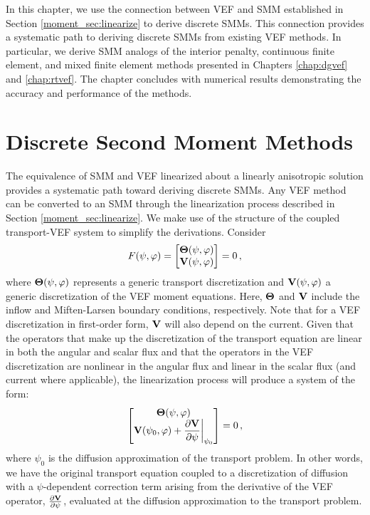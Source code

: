 \documentclass[../doc.tex]{subfiles}
\begin{document}
In this chapter, we use the connection between VEF and SMM established in Section \ref{moment_sec:linearize} to derive discrete SMMs. This connection provides a systematic path to deriving discrete SMMs from existing VEF methods. In particular, we derive SMM analogs of the interior penalty, continuous finite element, and mixed finite element methods presented in Chapters \ref{chap:dgvef} and \ref{chap:rtvef}. The chapter concludes with numerical results demonstrating the accuracy and performance of the methods. 

\section{Discrete Second Moment Methods}
The equivalence of SMM and VEF linearized about a linearly anisotropic solution provides a systematic path toward deriving discrete SMMs. Any VEF method can be converted to an SMM through the linearization process described in Section \ref{moment_sec:linearize}. We make use of the structure of the coupled transport-VEF system to simplify the derivations. Consider
	\begin{equation}
		F(\psi,\varphi) = \begin{bmatrix} 
			\boldsymbol{\mathrm{\Theta}}(\psi,\varphi) \\ \boldsymbol{\mathrm{V}}(\psi,\varphi) 
		\end{bmatrix} = 0\,,
	\end{equation}
where $\boldsymbol{\mathrm{\Theta}}(\psi,\varphi)$ represents a generic transport discretization and $\boldsymbol{\mathrm{V}}(\psi,\varphi)$ a generic discretization of the VEF moment equations. Here, $\boldsymbol{\mathrm{\Theta}}$ and $\boldsymbol{\mathrm{V}}$ include the inflow and Miften-Larsen boundary conditions, respectively. Note that for a VEF discretization in first-order form, $\boldsymbol{\mathrm{V}}$ will also depend on the current. Given that the operators that make up the discretization of the transport equation are linear in both the angular and scalar flux and that the operators in the VEF discretization are nonlinear in the angular flux and linear in the scalar flux (and current where applicable), the linearization process will produce a system of the form: 
	\begin{equation}
		\begin{bmatrix} 
			\boldsymbol{\mathrm{\Theta}}(\psi,\varphi) \\
			\displaystyle\boldsymbol{\mathrm{V}}(\psi_0,\varphi) + \frac{\partial \boldsymbol{\mathrm{V}}}{\partial \psi}\biggr\rvert_{\psi_0}
		\end{bmatrix} = 0 \,, 
	\end{equation}
where $\psi_0$ is the diffusion approximation of the transport problem. 
In other words, we have the original transport equation coupled to a discretization of diffusion with a $\psi$-dependent correction term arising from the derivative of the VEF operator, $\frac{\partial \boldsymbol{\mathrm{V}}}{\partial \psi}$, evaluated at the diffusion approximation to the transport problem. 
\end{document}
